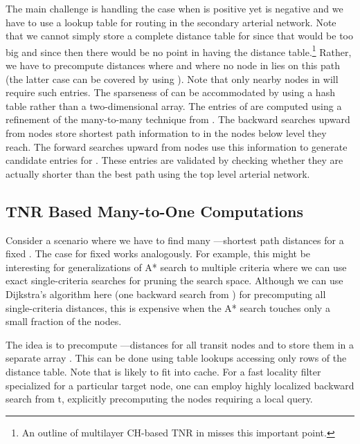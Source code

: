 \documentclass{llncs}
\begin{document}
The main challenge is handling the case when  is positive yet  is negative and we have to use a lookup table  for routing in the secondary arterial network. Note that we cannot simply store a complete distance table for  since that would be too big and since then there would be no point in having the  distance table.\footnote{An outline of multilayer CH-based TNR in \cite{Bast11} misses this important point.} Rather, we have to precompute distances  where  and where no node in  lies on this path (the latter case can be covered by using ). Note that only nearby nodes in  will require such entries. The sparseness of  can be accommodated by using a hash table rather than a two-dimensional array.  The entries of  are computed using a refinement of the many-to-many technique from \cite{ksssw-cmmsp-07,gssv-erlrn-12}. The backward searches upward from nodes  store shortest path information to  in the nodes below level  they reach. The forward searches upward from nodes  use this information to generate candidate entries for .  These entries are validated by checking whether they are actually shorter than the best path using the top level arterial network.
\subsection{TNR Based Many-to-One Computations}\label{s:manyToOne}

Consider a scenario where we have to find many ---shortest path distances for a fixed . The case for fixed  works analogously. For example, this might be interesting for generalizations of A* search to multiple criteria where we can use exact single-criteria searches for pruning the search space. Although we can use Dijkstra's algorithm here (one backward search from ) for precomputing all single-criteria distances, this is expensive when the A* search touches only a small fraction of the nodes. 

The idea is to precompute ---distances for all transit nodes  and to store them in a separate array . 
This can be done using  table lookups accessing only  rows of the distance table.
Note that  is likely to fit into cache. 
For a fast locality filter specialized for a particular target node, one can employ highly localized backward search from t, explicitly precomputing the nodes requiring a local query.
\end{document}
